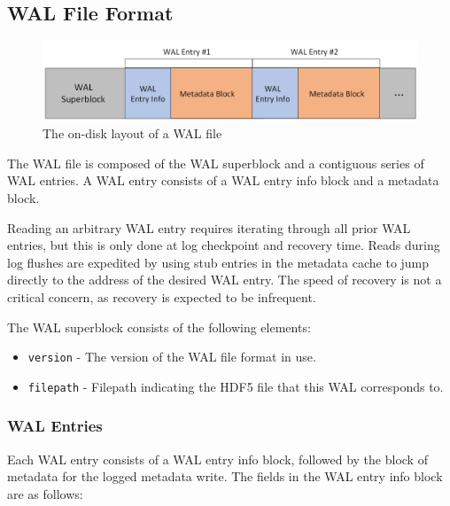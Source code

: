 \subsection{WAL File Format}

\begin{figure}
    \centering
    \includegraphics[width=1.0\textwidth]{images/wal_layout.png}
    \caption{The on-disk layout of a WAL file}
    \label{fig:wal-layout}
\end{figure}

The WAL file is composed of the WAL superblock and a contiguous series of WAL entries. A WAL entry consists of a WAL entry info block and a metadata block.

Reading an arbitrary WAL entry requires iterating through all prior WAL entries, but this is only done at log checkpoint and recovery time. Reads during log flushes are expedited by using stub entries in the metadata cache to jump directly to the address of the desired WAL entry. The speed of recovery is not a critical concern, as recovery is expected to be infrequent.

The WAL superblock consists of the following elements:

\begin{itemize}
    \item \texttt{version} - The version of the WAL file format in use.

    \item \texttt{filepath} - Filepath indicating the HDF5 file that this WAL corresponds to.

\end{itemize}

\subsubsection{WAL Entries}

Each WAL entry consists of a WAL entry info block, followed by the block of metadata for the logged metadata write. The fields in the WAL entry info block are as follows:

